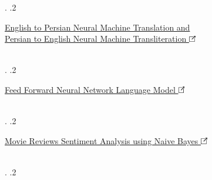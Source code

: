 \documentclass[]{rahulworld-resume}
\begin{document}
\begin{minipage}[t]{0.97\textwidth}
\begin{minipage}{\linewidth}
{\begin{minipage}{0.84\textwidth}
			\end{minipage}.
			.2  \begin{minipage}{0.84\textwidth}\vspace{3pt}\normalfont
				\large\href{https://github.com/BehzadShayegh/NMT}{English to Persian Neural Machine Translation and\\Persian to English Neural Machine Transliteration \includegraphics[width=8pt]{icons/redirect.png}}
				\\\vspace{3pt}
				\normalfont\normalsize{}
				\\\vspace{3pt}
			\end{minipage}.
			.2  \begin{minipage}{0.84\textwidth}\vspace{3pt}\normalfont
				\large\href{https://github.com/BehzadShayegh/FeedForwardNeuralNetworkLanguageModel}{Feed Forward Neural Network Language Model \includegraphics[width=8pt]{icons/redirect.png}}
				\\\vspace{3pt}
				\normalfont\normalsize{}
				\\\vspace{3pt}
			\end{minipage}.
			.2  \begin{minipage}{0.84\textwidth}\vspace{3pt}\normalfont
				\large\href{https://github.com/BehzadShayegh/MovieReviewsSentimentAnalysis}{Movie Reviews Sentiment Analysis using Naive Bayes \includegraphics[width=8pt]{icons/redirect.png}}
				\\\vspace{3pt}
				\normalfont\normalsize{}
				\\\vspace{3pt}
			\end{minipage}.
			.2  \begin{minipage}{0.84\textwidth}\vspace{3pt}\normalfont

\end{minipage}}
\end{minipage}
\end{minipage}
\end{document}
